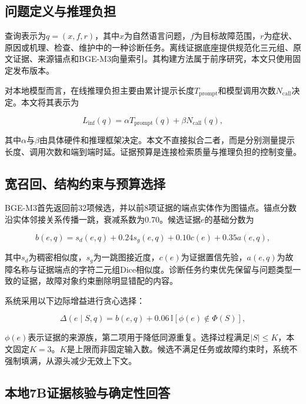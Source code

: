 \documentclass[conference]{IEEEtran}
\begin{document}
\subsection{问题定义与推理负担}

查询表示为$q=(x,f,r)$，其中$x$为自然语言问题，$f$为目标故障范围，$r$为症状、原因或机理、检查、维护中的一种诊断任务。离线证据底座提供规范化三元组、原文证据、来源锚点和BGE-M3向量索引。其构建方法属于前序研究，本文只使用固定发布版本。

对本地模型而言，在线推理负担主要由累计提示长度$T_{\mathrm{prompt}}$和模型调用次数$N_{\mathrm{call}}$决定。本文将其表示为

\begin{equation}
L_{\mathrm{inf}}(q)=\alpha T_{\mathrm{prompt}}(q)+\beta N_{\mathrm{call}}(q),
\label{eq:load}
\end{equation}

其中$\alpha$与$\beta$由具体硬件和推理框架决定。本文不直接拟合二者，而是分别测量提示长度、调用次数和端到端时延。证据预算是连接检索质量与推理负担的控制变量。

\subsection{宽召回、结构约束与预算选择}

BGE-M3首先返回前32项候选，并以前8项证据的端点实体作为图锚点。锚点分数沿实体邻接关系传播一跳，衰减系数为0.70。候选证据$e$的基础分数为

\begin{equation}
b(e,q)=s_d(e,q)+0.24s_g(e,q)+0.10c(e)+0.35a(e,q),
\label{eq:base}
\end{equation}

其中$s_d$为稠密相似度，$s_g$为一跳图接近度，$c(e)$为证据置信先验，$a(e,q)$为故障名称与证据端点的字符二元组Dice相似度。诊断任务约束优先保留与问题类型一致的证据，故障对象约束删除明显错配的内容。

系统采用以下边际增益进行贪心选择：

\begin{equation}
\Delta(e\mid S,q)=b(e,q)+0.06\,\mathbb{I}[\phi(e)\notin\Phi(S)],
\label{eq:select}
\end{equation}

$\phi(e)$表示证据的来源族，第二项用于降低同源重复。选择过程满足$|S|\leq K$，本文固定$K=3$。$K$是上限而非固定输入数。候选不满足任务或故障约束时，系统不强制填满，从源头减少无效上下文。

\subsection{本地7B证据核验与确定性回答}
\end{document}
